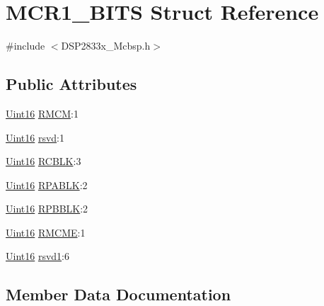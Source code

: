 \hypertarget{struct_m_c_r1___b_i_t_s}{}\section{M\+C\+R1\+\_\+\+B\+I\+T\+S Struct Reference}
\label{struct_m_c_r1___b_i_t_s}


{\ttfamily \#include $<$D\+S\+P2833x\+\_\+\+Mcbsp.\+h$>$}

\subsection*{Public Attributes}
\begin{DoxyCompactItemize}
\item 
\hyperlink{_d_s_p2833x___device_8h_a59a9f6be4562c327cbfb4f7e8e18f08b}{Uint16} \hyperlink{struct_m_c_r1___b_i_t_s_a815eb9f0241a9689855f281ac470fce1}{R\+M\+C\+M}\+:1
\item 
\hyperlink{_d_s_p2833x___device_8h_a59a9f6be4562c327cbfb4f7e8e18f08b}{Uint16} \hyperlink{struct_m_c_r1___b_i_t_s_aed1b51460a5f1e89a312c59fd51d581c}{rsvd}\+:1
\item 
\hyperlink{_d_s_p2833x___device_8h_a59a9f6be4562c327cbfb4f7e8e18f08b}{Uint16} \hyperlink{struct_m_c_r1___b_i_t_s_a19c91cdab7e9f0d66f8502047d5ec76d}{R\+C\+B\+L\+K}\+:3
\item 
\hyperlink{_d_s_p2833x___device_8h_a59a9f6be4562c327cbfb4f7e8e18f08b}{Uint16} \hyperlink{struct_m_c_r1___b_i_t_s_a43e6542174aa87bf004f46a67b329d53}{R\+P\+A\+B\+L\+K}\+:2
\item 
\hyperlink{_d_s_p2833x___device_8h_a59a9f6be4562c327cbfb4f7e8e18f08b}{Uint16} \hyperlink{struct_m_c_r1___b_i_t_s_a946c847f4ce0d993049db5c00ce805a1}{R\+P\+B\+B\+L\+K}\+:2
\item 
\hyperlink{_d_s_p2833x___device_8h_a59a9f6be4562c327cbfb4f7e8e18f08b}{Uint16} \hyperlink{struct_m_c_r1___b_i_t_s_ade27d330e9086c49ab0dda1f6f0b7db3}{R\+M\+C\+M\+E}\+:1
\item 
\hyperlink{_d_s_p2833x___device_8h_a59a9f6be4562c327cbfb4f7e8e18f08b}{Uint16} \hyperlink{struct_m_c_r1___b_i_t_s_a794adfb0e561f35d1e0488670ee61f97}{rsvd1}\+:6
\end{DoxyCompactItemize}


\subsection{Member Data Documentation}
\hypertarget{struct_m_c_r1___b_i_t_s_a19c91cdab7e9f0d66f8502047d5ec76d}{}
